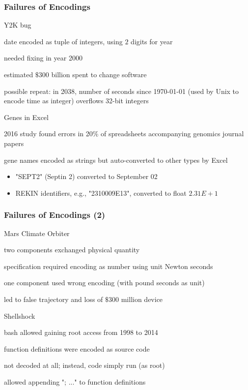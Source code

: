 \begin{frame}\frametitle{Failures of Encodings}
\begin{blockitems}{Y2K bug}
\item date encoded as tuple of integers, using $2$ digits for year
\item needed fixing in year 2000
\item estimated $\$300$ billion spent to change software
\item possible repeat: in 2038, number of seconds since 1970-01-01 (used by Unix to encode time as integer) overflows 32-bit integers
\end{blockitems}

\begin{blockitems}{Genes in Excel}
 \item 2016 study found errors in 20\% of spreadsheets accompanying genomics journal papers
 \item gene names encoded as strings but auto-converted to other types by Excel
 \begin{itemize}
 \item "SEPT2" (Septin 2) converted to September 02
 \item REKIN identifiers, e.g., "2310009E13", converted to float $2.31E+1$
 \end{itemize}
\end{blockitems}
\end{frame}

\begin{frame}\frametitle{Failures of Encodings (2)}
\begin{blockitems}{Mars Climate Orbiter}
\item two components exchanged physical quantity
\item specification required encoding as number using unit Newton seconds
\item one component used wrong encoding (with pound seconds as unit)
\item led to false trajectory and loss of $\$300$ million device
\end{blockitems}

\begin{blockitems}{Shellshock}
\item bash allowed gaining root access from 1998 to 2014
\item function definitions were encoded as source code
\item not decoded at all; instead, code simply run (as root)
\item allowed appending "; ..." to function definitions
\end{blockitems}

\end{frame}

